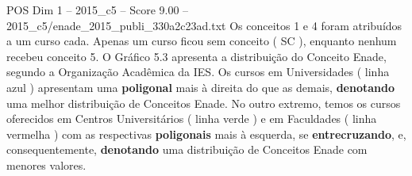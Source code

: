 \begin{textsample}{POS Dim 1 – 2015\_c5 – Score 9.00 – 2015\_c5/enade\_2015\_publi\_330a2c23ad.txt}
Os conceitos 1 e 4 foram atribuídos a um curso cada.
Apenas um curso ficou sem conceito ( SC ), enquanto nenhum recebeu conceito 5.
O Gráfico 5.3 apresenta a distribuição do Conceito Enade, segundo a Organização Acadêmica da IES.
Os cursos em Universidades ( linha azul ) apresentam uma \textbf{poligonal} mais à direita do que as demais, \textbf{denotando} uma melhor distribuição de Conceitos Enade.
No outro extremo, temos os cursos oferecidos em Centros Universitários ( linha verde ) e em Faculdades ( linha vermelha ) com as respectivas \textbf{poligonais} mais à esquerda, se \textbf{entrecruzando}, e, consequentemente, \textbf{denotando} uma distribuição de Conceitos Enade com menores valores.

\end{textsample}
